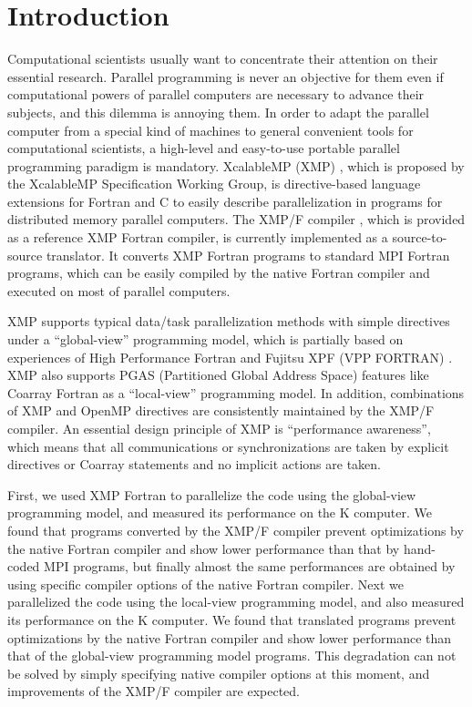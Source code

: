 \documentclass[graybox]{svmult}
\begin{document}
\section{Introduction}
Computational scientists usually want to concentrate their attention on their essential research. Parallel programming is never an objective for them even if computational powers of parallel computers are necessary to advance their subjects, and this dilemma is annoying them. In order to adapt the parallel computer from a special kind of machines to general convenient tools for computational scientists, a high-level and easy-to-use portable parallel programming paradigm is mandatory. XcalableMP (XMP) \cite{XMP}, which is proposed by the XcalableMP Specification Working Group, is directive-based language extensions for Fortran and C to easily describe parallelization in programs for distributed memory parallel computers. The XMP/F compiler \cite{Omni}, which is provided as a reference XMP Fortran compiler, is currently implemented as a source-to-source translator. It converts XMP Fortran programs to standard MPI Fortran programs, which can be easily compiled by the native Fortran compiler and executed on most of parallel computers.

XMP supports typical data/task parallelization methods with simple directives under a ``global-view'' programming model, which is partially based on experiences of High Performance Fortran \cite{HPF,Ken} and Fujitsu XPF (VPP FORTRAN) \cite{Zhang}. XMP also supports PGAS (Partitioned Global Address Space) features like Coarray Fortran \cite{CAF} as a ``local-view'' programming model. In addition, combinations of XMP and OpenMP directives are consistently maintained by the XMP/F compiler. An essential design principle of XMP is ``performance awareness'', which means that all communications or synchronizations are taken by explicit directives or Coarray statements and no implicit actions are taken.

First, we used XMP Fortran to parallelize the code using the global-view programming model, and measured its performance on the K computer. We found that programs converted by the XMP/F compiler prevent optimizations by the native Fortran compiler and show lower performance than that by hand-coded MPI programs, but finally almost the same performances are obtained by using specific compiler options of the native Fortran compiler. Next we parallelized the code using the local-view programming model, and also measured its performance on the K computer. We found that translated programs prevent optimizations by the native Fortran compiler and show lower performance than that of the global-view programming model programs. This degradation can not be solved by simply specifying native compiler options at this moment, and improvements of the XMP/F compiler are expected.
\end{document}
